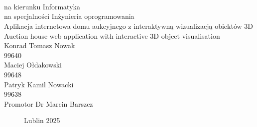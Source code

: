 \documentclass[12pt,a4paper]{article}
\def\blankpage{%
      \clearpage%
      \thispagestyle{empty}%
      \null%
      \clearpage}
\newcommand{\newCharapter}[1]{\newpage }
\begin{document}



\begin{titlepage}
    \titlepagefont
     \\
    \vspace{4cm}
    \break
    \fontsize{1.4cm}{1.4cm} \\
    \fontsize{1.4cm}{1.4cm} \\
    \vspace{0.5cm}
    \break
    \normalsize{} na kierunku Informatyka \\
    na specjalności Inżynieria oprogramowania \\
    \vspace{1cm}
    \break
    \large
    Aplikacja internetowa domu aukcyjnego z interaktywną wizualizacją obiektów 3D \\
    \break
    Auction house web application with interactive 3D object visualisation \\
    \vspace{1.5cm}
    \break
    Konrad Tomasz Nowak \\
    99640   \\[0.3cm]
    Maciej Ołdakowski \\
    99648   \\[0.3cm]
    Patryk Kamil Nowacki \\
    99638   \\[0.3cm]
    \vspace{1.5cm}
    \break
    \normalsize{}
    Promotor Dr Marcin Barszcz
    \vspace*{\fill}
    \begin{figure}[bbp]
        {\titlepagefont Lublin 2025}
    \end{figure}
\end{titlepage}

\onehalfspacing
\blankpage

\newCharapter{chapters/0abstract}
\setcounter{figure}{0}
\end{document}
